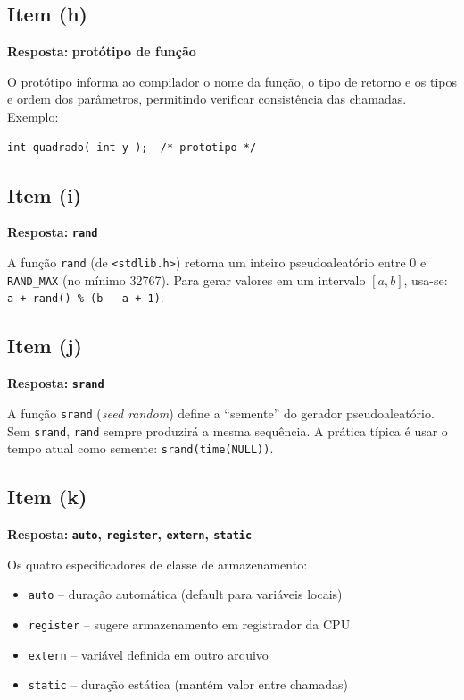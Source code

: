 \documentclass[12pt,a4paper]{article}
\begin{document}
\subsection*{Item (h)}
\begin{respostabox}
\textbf{Resposta:} \textcolor{deitelblue}{\textbf{protótipo de função}}

O protótipo informa ao compilador o nome da função, o tipo de retorno e os tipos e
ordem dos parâmetros, permitindo verificar consistência das chamadas. Exemplo:
\begin{lstlisting}
int quadrado( int y );  /* prototipo */
\end{lstlisting}
\end{respostabox}

\subsection*{Item (i)}
\begin{respostabox}
\textbf{Resposta:} \textcolor{deitelblue}{\textbf{\texttt{rand}}}

A função \texttt{rand} (de \texttt{<stdlib.h>}) retorna um inteiro pseudoaleatório
entre 0 e \texttt{RAND\_MAX} (no mínimo 32767). Para gerar valores em um intervalo
$[a, b]$, usa-se: \texttt{a + rand() \% (b - a + 1)}.
\end{respostabox}

\subsection*{Item (j)}
\begin{respostabox}
\textbf{Resposta:} \textcolor{deitelblue}{\textbf{\texttt{srand}}}

A função \texttt{srand} (\textit{seed random}) define a ``semente'' do gerador
pseudoaleatório. Sem \texttt{srand}, \texttt{rand} sempre produzirá a mesma sequência.
A prática típica é usar o tempo atual como semente: \texttt{srand(time(NULL))}.
\end{respostabox}

\subsection*{Item (k)}
\begin{respostabox}
\textbf{Resposta:} \textcolor{deitelblue}{\textbf{\texttt{auto}, \texttt{register}, \texttt{extern}, \texttt{static}}}

Os quatro especificadores de classe de armazenamento:
\begin{itemize}[noitemsep]
  \item \texttt{auto} -- duração automática (default para variáveis locais)
  \item \texttt{register} -- sugere armazenamento em registrador da CPU
  \item \texttt{extern} -- variável definida em outro arquivo
  \item \texttt{static} -- duração estática (mantém valor entre chamadas)
\end{itemize}
\end{respostabox}
\end{document}
